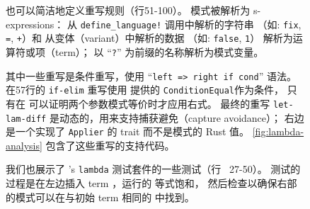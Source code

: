 \begin{figure}
{%
也可以简洁地定义重写规则（行51-100）。
模式被解析为 s-expressions：
  从 \texttt{define\_language!} 调用中解析的字符串
  （如: \texttt{fix}, \texttt{=}, \texttt{+}）和
  从变体（variant）中解析的数据 %
  （如: \texttt{false}, \texttt{1}）
  解析为运算符或项（term）；%
  以 ``\texttt{?}'' 为前缀的名称解析为模式变量。

其中一些重写是条件重写，使用 ``\texttt{left => right if cond}'' 语法。
在57行的 \texttt{if-elim} 重写使用 \egg 提供的
  \texttt{ConditionEqual}作为条件，
  只有在 \egraph 可以证明两个参数模式等价时才应用右式。
最终的重写 \texttt{let-lam-diff} 是动态的，用来支持捕获避免（capture avoidance）；
  右边是一个实现了 \texttt{Applier} 的 trait 而不是模式的 Rust 值。%
\autoref{fig:lambda-analysis} 包含了这些重写的支持代码。

我们也展示了 \egg's \texttt{lambda} 测试套件的一些测试（行~ 27-50）。
测试的过程是在左边插入 term ，运行\egg 的 等式饱和，
  然后检查以确保右部的模式可以在与初始 term 相同的 \eclass 中找到。
}
\label{fig:lambda-rules}
\label{fig:lambda-lang}
\label{fig:lambda-examples}
\end{figure}




